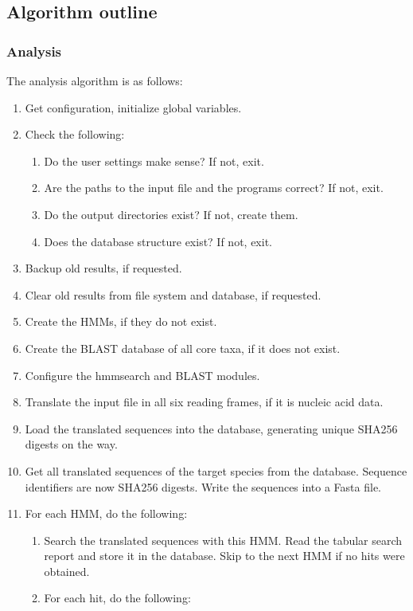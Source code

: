 \subsection{Algorithm outline}

\subsubsection{Analysis}

The analysis algorithm is as follows:

\begin{enumerate}
	\item Get configuration, initialize global variables.
	\item Check the following:
	\begin{enumerate}
		\item Do the user settings make sense? If not, exit.
		\item Are the paths to the input file and the programs correct? If not, exit.
		\item Do the output directories exist? If not, create them.
		\item Does the database structure exist? If not, exit.
	\end{enumerate}
	\item Backup old results, if requested.
	\item Clear old results from file system and database, if requested.
	\item Create the HMMs, if they do not exist.
	\item Create the BLAST database of all core taxa, if it does not exist.
	\item Configure the hmmsearch and BLAST modules.
	\item Translate the input file in all six reading frames, if it is nucleic acid data.
	\item Load the translated sequences into the database, generating unique SHA256
		digests on the way.
	\item Get all translated sequences of the target species from the database.
		Sequence identifiers are now SHA256 digests. Write the sequences into a
		Fasta file.
	\item For each HMM, do the following:
	\begin{enumerate}
		\item Search the translated sequences with this HMM. Read the tabular search
			report and store it in the database. Skip to the next HMM if no hits were
			obtained.
		\item For each hit, do the following:

\end{enumerate}
\end{enumerate}
